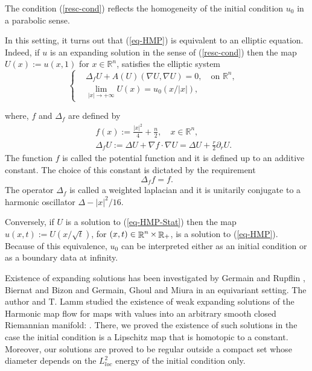 \documentclass[a4paper,11pt,reqno]{amsart}
\def\R{\mathop{\rm \mathbb{R}}\nolimits}
\begin{document}
 The condition (\ref{resc-cond}) reflects the homogeneity of the initial condition $u_0$ in a parabolic sense.
 
  In this setting, it turns out that (\ref{eq-HMP}) is equivalent to an elliptic equation. Indeed, if $u$ is an expanding solution in the sense of (\ref{resc-cond}) then the map $U(x):=u(x,1)$ for $x\in \mathbb{R}^n$, satisfies the elliptic system
\begin{equation}
\left\{\begin{aligned}
&\Delta_f U+A(U)(\nabla U,\nabla U)=0,\quad\mbox{on $\mathbb{R}^n$},&\label{eq-HMP-Stat}\\
&\lim_{|x|\rightarrow+\infty}U(x)=u_0(x/|x|),&
\end{aligned}
\right.
\end{equation}
 
where, $f$ and $\Delta_f$ are defined by
\begin{eqnarray*}
&&f(x):=\frac{|x|^2}{4}+\frac{n}{2},\quad x\in\mathbb{R}^n,\\
&&\Delta_fU:=\Delta U+\nabla f\cdot\nabla U=\Delta U+\frac{r}{2}\partial_rU.
\end{eqnarray*}
The function $f$ is called the potential function and it is defined up to an additive constant. The choice of this constant is dictated by the requirement $$\Delta_ff=f.$$ The operator $\Delta_f$ is called a weighted laplacian and it is unitarily conjugate to a harmonic oscillator $\Delta-|x|^2/16$.

Conversely, if $U$ is a solution to (\ref{eq-HMP-Stat}) then the map $u(x,t):=U(x/\sqrt{t})$, for $(x,t)\in\R^n\times\R_+$, is a solution to (\ref{eq-HMP}). Because of this equivalence, $u_0$ can be interpreted either as an initial condition or as a boundary data at infinity. 

Existence of expanding solutions has been investigated by Germain and Rupflin \cite{Ger-Rup}, Biernat and Bizon \cite{Bie-Biz} and Germain, Ghoul and Miura \cite{Ger-Gho-Miu} in an equivariant setting. The author and T. Lamm studied the existence of weak expanding solutions of the Harmonic map flow for maps with values into an arbitrary smooth closed Riemannian manifold: \cite{Der-Lam-HMF}. There, we proved the existence of such solutions in the case the initial condition is a Lipschitz map that is homotopic to a constant. Moreover, our solutions are proved to be regular outside a compact set whose diameter depends on the $L^2_{loc}$ energy of the initial condition only.\\
\end{document}
